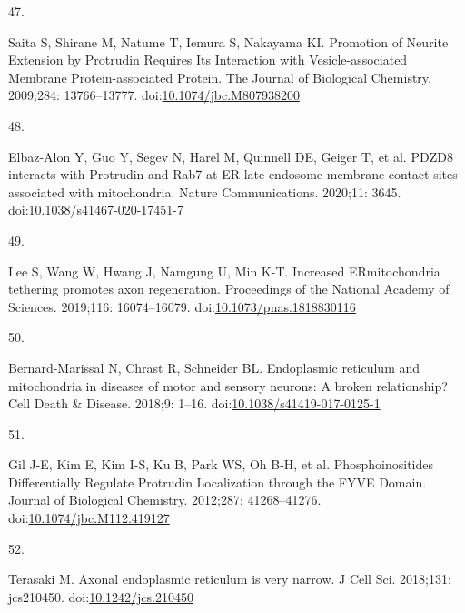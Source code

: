 \documentclass[
  12pt,
  a4paper,
]{book}
\newlength{\cslhangindent}
\newlength{\csllabelwidth}
\newlength{\cslentryspacingunit} %
\newenvironment{CSLReferences}[2] %
 {%
  \setlength{\parindent}{0pt}
  \ifodd #1
  \let\oldpar\par
  \def\par{\hangindent=\cslhangindent\oldpar}
  \fi
  \setlength{\parskip}{#2\cslentryspacingunit}
 }%
 {}
\newcommand{\CSLLeftMargin}[1]{\parbox[t]{\csllabelwidth}{#1}}
\newcommand{\CSLRightInline}[1]{\parbox[t]{\linewidth - \csllabelwidth}{#1}\break}
\begin{document}
\begin{CSLReferences}{0}{0}
\leavevmode{}%
\CSLLeftMargin{47. }%
\CSLRightInline{Saita S, Shirane M, Natume T, Iemura S, Nakayama KI. Promotion of {Neurite Extension} by {Protrudin Requires Its Interaction} with {Vesicle-associated Membrane Protein-associated Protein}. The Journal of Biological Chemistry. 2009;284: 13766--13777. doi:\href{https://doi.org/10.1074/jbc.M807938200}{10.1074/jbc.M807938200}}

\leavevmode{}%
\CSLLeftMargin{48. }%
\CSLRightInline{Elbaz-Alon Y, Guo Y, Segev N, Harel M, Quinnell DE, Geiger T, et al. {PDZD8} interacts with {Protrudin} and {Rab7} at {ER-late} endosome membrane contact sites associated with mitochondria. Nature Communications. 2020;11: 3645. doi:\href{https://doi.org/10.1038/s41467-020-17451-7}{10.1038/s41467-020-17451-7}}

\leavevmode{}%
\CSLLeftMargin{49. }%
\CSLRightInline{Lee S, Wang W, Hwang J, Namgung U, Min K-T. Increased {ER}\textendash mitochondria tethering promotes axon regeneration. Proceedings of the National Academy of Sciences. 2019;116: 16074--16079. doi:\href{https://doi.org/10.1073/pnas.1818830116}{10.1073/pnas.1818830116}}

\leavevmode{}%
\CSLLeftMargin{50. }%
\CSLRightInline{Bernard-Marissal N, Chrast R, Schneider BL. Endoplasmic reticulum and mitochondria in diseases of motor and sensory neurons: A broken relationship? Cell Death \& Disease. 2018;9: 1--16. doi:\href{https://doi.org/10.1038/s41419-017-0125-1}{10.1038/s41419-017-0125-1}}

\leavevmode{}%
\CSLLeftMargin{51. }%
\CSLRightInline{Gil J-E, Kim E, Kim I-S, Ku B, Park WS, Oh B-H, et al. Phosphoinositides {Differentially Regulate Protrudin Localization} through the {FYVE Domain}. Journal of Biological Chemistry. 2012;287: 41268--41276. doi:\href{https://doi.org/10.1074/jbc.M112.419127}{10.1074/jbc.M112.419127}}

\leavevmode{}%
\CSLLeftMargin{52. }%
\CSLRightInline{Terasaki M. Axonal endoplasmic reticulum is very narrow. J Cell Sci. 2018;131: jcs210450. doi:\href{https://doi.org/10.1242/jcs.210450}{10.1242/jcs.210450}}


\end{CSLReferences}
\end{document}
